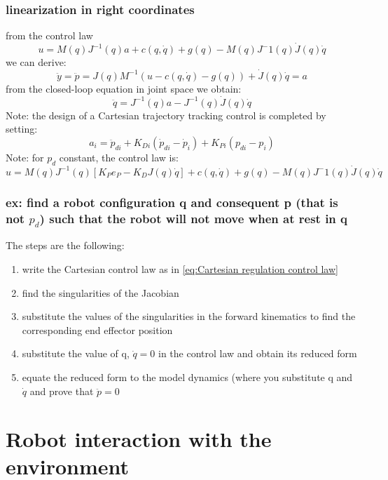 \documentclass[a4paper,12pt]{article}
\begin{document}
\subsubsection{linearization in right coordinates}
from the control law
\begin{equation}
u = M(q)J^{-1}(q)a + c(q,\dot{q}) + g(q) - M(q)J^-1(q)\dot{J}(q)\dot{q}
\end{equation}
 we can derive:
\begin{equation}
\ddot{y}=\ddot{p}= J(q)M^{-1}(u-c(q,\dot{q})-g(q))+\dot{J}(q)\dot{q}=a
\end{equation}
from the closed-loop equation in joint space we obtain:
\begin{equation}
    \ddot{q}=J^{-1}(q)a-J^{-1}(q)\dot{J}(q)\dot{q}
\end{equation}
Note: the design of a Cartesian trajectory tracking control is completed
by setting:
\begin{equation}
a_i=\ddot{p}_{di}+K_{Di}(\dot{p}_{di}-\dot{p}_i)+K_{Pi}(p_{di}-p_i)
\end{equation}
Note: for $p_d$ constant, the control law is:
\begin{equation}
    u = M(q)J^{-1}(q)[K_Pe_P-K_DJ(q)\dot{q}]+c(q,\dot{q})+g(q) - M(q)J^-1(q)\dot{J}(q)\dot{q}
\end{equation}

\subsubsection{ex: find a robot configuration q and consequent p (that is not 
$p_d$) such that the robot will not move when at rest in q}
The steps are the following:
\begin{enumerate}
    \item write the Cartesian control law as in \ref{eq:Cartesian regulation control law}
    \item find the singularities of the Jacobian
    \item substitute the values of the singularities in the forward
    kinematics to find the corresponding end effector position
    \item substitute the value of q, $\dot{q}=0$ in the control law 
    and obtain its reduced form
    \item equate the reduced form to the model dynamics 
    (where you substitute q and $\dot{q}$ 
    and 
    prove that $\ddot{p}=0$
\end{enumerate}


\section{Robot interaction with the environment}
\end{document}
